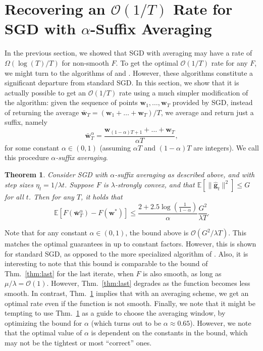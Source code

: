 \documentclass{article}
\newtheorem{theorem}{Theorem}
\newcommand{\E}{\mathbb{E}}
\newcommand{\bw}{\mathbf{w}}
\newcommand{\bg}{\mathbf{g}}
\newcommand{\Ocal}{\mathcal{O}}
\newcommand{\norm}[1]{\|#1\|}
\newcommand{\thmref}[1]{Thm.~\ref{#1}}
\begin{document}
\section{Recovering an $\Ocal(1/T)$ Rate for SGD with $\alpha$-Suffix Averaging}\label{sec:suffix}

In the previous section, we showed that SGD with averaging may have a rate of $\Omega(\log(T)/T)$ for non-smooth $F$. To get the optimal $\Ocal(1/T)$ rate for any $F$, we might turn to the algorithms of \cite{HazanKa11} and \cite{JudNes11}. However, these algorithms constitute  a significant departure from standard SGD. In this section, we show that it is actually possible to get an $\Ocal(1/T)$ rate using a much simpler modification of the algorithm: given the sequence of points $\bw_1,\ldots,\bw_T$ provided by SGD, instead of returning the average $\bar{\bw}_T = (\bw_1+\ldots+\bw_T)/T$, we average and return just a suffix, namely
\[
\bar{\bw}^{\alpha}_T = \frac{\bw_{(1-\alpha)T+1}+\ldots+\bw_T}{\alpha T},
\]
for some constant $\alpha\in (0,1)$ (assuming $\alpha T$ and $(1-\alpha)T$ are integers). We call this procedure \emph{$\alpha$-suffix averaging}.

\begin{theorem}\label{thm:alphaaveraging}
Consider SGD with $\alpha$-suffix averaging as described above, and with step sizes $\eta_t=1/\lambda t$. Suppose $F$ is $\lambda$-strongly convex, and that $\E[\norm{\hat{\bg}_t}^2]\leq G$ for all $t$. Then for any $T$, it holds that
\[
\E[F(\bar{\bw}^{\alpha}_{T})-F(\bw^*)] \leq \frac{2+2.5 \log\left(\frac{1}{1-\alpha}\right)}{\alpha}
\frac{G^2}{\lambda T}.
\]
\end{theorem}
Note that for any constant $\alpha\in (0,1)$, the bound above is $\Ocal(G^2/\lambda T)$. This matches the optimal guarantees in \cite{HazanKa11} up to constant factors. However, this is shown for standard SGD, as opposed to the more specialized algorithm of \cite{HazanKa11}. Also, it is interesting to note that this bound is comparable to the bound of \thmref{thm:last} for the last iterate, when $F$ is also smooth, as long as $\mu/\lambda = \Ocal(1)$. However, \thmref{thm:last} degrades as the function becomes less smooth. In contrast, \thmref{thm:alphaaveraging} implies that with an averaging scheme, we get an optimal rate even if the function is not smooth. Finally, we note that it might be tempting to use \thmref{thm:alphaaveraging} as a guide to choose the averaging window, by optimizing the bound for $\alpha$ (which turns out to be $\alpha\approx 0.65$). However, we note that the optimal value of $\alpha$ is dependent on the constants in the bound, which may not be the tightest or most ``correct'' ones.
\end{document}
